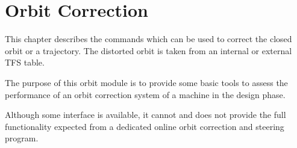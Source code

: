 
\chapter{Orbit Correction}  

This chapter describes the commands which can be used to correct the
closed orbit or a trajectory. The distorted orbit is taken from an
internal or external TFS table.  

The purpose of this orbit module is to provide some basic tools to
assess the performance of an orbit correction system of a machine in the
design phase.  

Although some interface is available, it cannot and does not provide the
full functionality expected from a dedicated online orbit correction and
steering program.  




 




